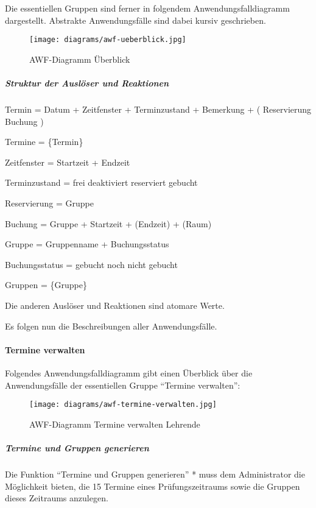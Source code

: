 \documentclass[]{article}
\let\oldparagraph\paragraph
\renewcommand{\paragraph}[1]{\oldparagraph{#1}\mbox{}}
\let\oldsubparagraph\subparagraph
\renewcommand{\subparagraph}[1]{\oldsubparagraph{#1}\mbox{}}
\begin{document}
Die essentiellen Gruppen sind ferner in folgendem Anwendungsfalldiagramm
dargestellt. Abstrakte Anwendungsfälle sind dabei kursiv geschrieben.

\begin{figure}
\centering
\texttt{[image: diagrams/awf-ueberblick.jpg]}
\caption{AWF-Diagramm Überblick}
\end{figure}

\hypertarget{struktur-der-ausluxf6ser-und-reaktionen}{%
\subparagraph{Struktur der Auslöser und
Reaktionen}\label{struktur-der-ausluxf6ser-und-reaktionen}}

Termin = Datum + Zeitfenster + Terminzustand + Bemerkung + (
Reservierung \textbar{} Buchung )

Termine = \{Termin\}

Zeitfenster = Startzeit + Endzeit

Terminzustand = frei \textbar{} deaktiviert \textbar{} reserviert
\textbar{} gebucht

Reservierung = Gruppe

Buchung = Gruppe + Startzeit + (Endzeit) + (Raum)

Gruppe = Gruppenname + Buchungsstatus

Buchungsstatus = gebucht \textbar{} noch nicht gebucht

Gruppen = \{Gruppe\}

Die anderen Auslöser und Reaktionen sind atomare Werte.

Es folgen nun die Beschreibungen aller Anwendungsfälle.

\hypertarget{termine-verwalten}{%
\paragraph{Termine verwalten}\label{termine-verwalten}}

Folgendes Anwendungsfalldiagramm gibt einen Überblick über die
Anwendungsfälle der essentiellen Gruppe ``Termine verwalten'':

\begin{figure}
\centering
\texttt{[image: diagrams/awf-termine-verwalten.jpg]}
\caption{AWF-Diagramm Termine verwalten Lehrende}
\end{figure}

\hypertarget{termine-und-gruppen-generieren}{%
\subparagraph{Termine und Gruppen
generieren}\label{termine-und-gruppen-generieren}}

Die Funktion ``Termine und Gruppen generieren'' * muss dem Administrator
die Möglichkeit bieten, die 15 Termine eines Prüfungszeitraums sowie die
Gruppen dieses Zeitraums anzulegen.
\end{document}
